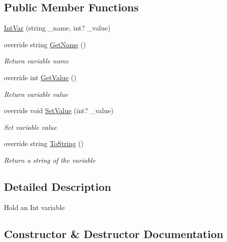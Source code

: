 \subsection*{Public Member Functions}
\begin{DoxyCompactItemize}
\item 
\mbox{\hyperlink{class_krop_1_1_krop_execution_tree_1_1_variable_1_1_int_var_a9634bcdaa2d3d803ef3eb585e1533366}{Int\+Var}} (string \+\_\+name, int? \+\_\+value)
\item 
override string \mbox{\hyperlink{class_krop_1_1_krop_execution_tree_1_1_variable_1_1_int_var_ae48d754976bd6ed849a048ae209a689a}{Get\+Name}} ()
\begin{DoxyCompactList}\small\item\em Return variable name \end{DoxyCompactList}\item 
override int \mbox{\hyperlink{class_krop_1_1_krop_execution_tree_1_1_variable_1_1_int_var_a286e20f12bf8a03b9586596253a97144}{Get\+Value}} ()
\begin{DoxyCompactList}\small\item\em Return variable value \end{DoxyCompactList}\item 
override void \mbox{\hyperlink{class_krop_1_1_krop_execution_tree_1_1_variable_1_1_int_var_a437c24097ebfe4173e39880e76eb7d8b}{Set\+Value}} (int? \+\_\+value)
\begin{DoxyCompactList}\small\item\em Set variable value \end{DoxyCompactList}\item 
override string \mbox{\hyperlink{class_krop_1_1_krop_execution_tree_1_1_variable_1_1_int_var_acfe213da1e8d6fb0590872d3e7f9195b}{To\+String}} ()
\begin{DoxyCompactList}\small\item\em Return a string of the variable \end{DoxyCompactList}\end{DoxyCompactItemize}


\subsection{Detailed Description}
Hold an Int variable 



\subsection{Constructor \& Destructor Documentation}
\mbox{\label{class_krop_1_1_krop_execution_tree_1_1_variable_1_1_int_var_a9634bcdaa2d3d803ef3eb585e1533366}} 

